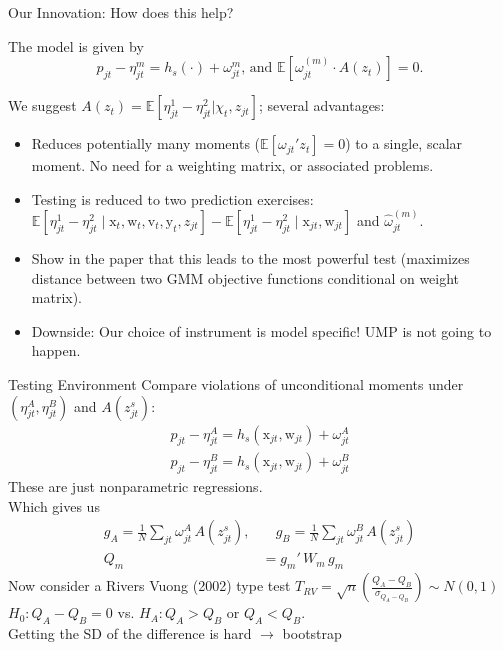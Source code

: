 \documentclass[aspectratio=169,10pt]{beamer}
\begin{document}
\begin{frame}[plain,label=innovation]{Our Innovation: How does this help?}
\begin{small}
The model is given by
$$p_{jt} - \eta^m_{jt} = h_s(\cdot) +  \omega^m_{jt} \text{,   and  } \mathbb{E}[\omega_{jt}^{(m)}\cdot A(z_t)] = 0.$$

We suggest $A(z_t) = \mathbb{E}[\eta^1_{jt}-\eta_{jt}^2|\chi_t, z_{jt}]$; several advantages:

\begin{itemize}
\item Reduces potentially many moments ($\mathbb{E}[\omega_{jt}' z_t]=0$) to a single, scalar moment. No need for a weighting matrix, or associated problems.
\item Testing is reduced to two prediction exercises: $\mathbb{E}[\eta^1_{jt}-\eta_{jt}^2 \mid \textrm{x}_t, \textrm{w}_t,\textrm{v}_t,\textrm{y}_t, z_{jt}] - \mathbb{E}[\eta^1_{jt}-\eta_{jt}^2 \mid \textrm{x}_{jt}, \textrm{w}_{jt}]$ and $\widehat \omega_{jt}^{(m)}$.
\item Show in the paper that this leads to the most powerful test (maximizes distance between two GMM objective functions conditional on weight matrix).
\item Downside: Our choice of instrument is \alert{model specific}! UMP is not going to happen.
\end{itemize}
\end{small}
\end{frame}



\begin{frame}{Testing Environment}
Compare violations of unconditional moments under $(\eta_{jt}^A, \eta_{jt}^B)$ and $A(z_{jt}^s)$:
\begin{align*}
p_{jt} -  \eta_{jt}^A = h_s(\textrm{x}_{jt},\textrm{w}_{jt}) + \omega_{jt}^{A}\\
p_{jt} -  \eta_{jt}^B = h_s(\textrm{x}_{jt},\textrm{w}_{jt}) + \omega_{jt}^{B}
\end{align*}
These are just \alert{nonparametric regressions}.\\

Which gives us
\begin{align*}
g_A = \frac{1}{N} \sum_{jt} \omega_{jt}^{A}\, A(z_{jt}^s), &\quad
g_B =\frac{1}{N} \sum_{jt}  \omega_{jt}^{B}\, A(z_{jt}^s)\\
Q_m &= g_m'\, W_m\, g_m
\end{align*}
Now consider a \alert{Rivers Vuong (2002)} type test $T_{RV} = \sqrt{n} \left(\frac{Q_A - Q_B}{\sigma_{Q_A - Q_B}}\right) \sim N(0,1)$
$H_0: Q_A - Q_B=0$ vs. $H_A: Q_A > Q_B$ or $Q_A < Q_B$.\\
Getting the SD of the difference is hard $\rightarrow$ bootstrap 
\end{frame}
\end{document}
